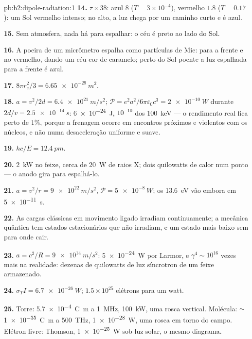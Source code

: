 \begin{solution}{pb:b2:dipole-radiation:1}
\textbf{14.} $\tau \times 38$: azul $8$ ($T = 3 \times 10^{-4}$), vermelho $1.8$ ($T = 0.17$): um Sol
vermelho intenso; no alto, a luz chega por um caminho curto e é azul.

\textbf{15.} Sem atmosfera, nada há para espalhar: o céu é preto ao lado
do Sol.

\textbf{16.} A poeira de um micrômetro espalha como partículas de Mie: para a frente e no
vermelho, dando um céu cor de caramelo; perto do Sol poente a luz
espalhada para a frente é azul.

\textbf{17.} $8\pi r_e^2/3 = \qty{6.65e-29}{m^2}$.

\textbf{18.} $a = v^2/2d = \qty{6.4e21}{m/s^2}$; $\mathcal P = e^2a^2/6\pi\varepsilon_0c^3 =
\qty{2e-10}{W}$ durante $2d/v = \qty{2.5e-14}{s}$: \qty{6e-24}{J}, $10^{-10}$ dos
\qty{100}{keV} --- o rendimento real fica perto de $1\%$, porque a frenagem ocorre
em encontros próximos e violentos com os núcleos, e não numa desaceleração
uniforme e suave.

\textbf{19.} $hc/E = \qty{12.4}{pm}$.

\textbf{20.} \qty{2}{kW} no feixe, cerca de \qty{20}{W} de raios X; dois quilowatts
de calor num ponto --- o anodo gira para espalhá-lo.

\textbf{21.} $a = v^2/r = \qty{9e22}{m/s^2}$, $\mathcal P = \qty{5e-8}{W}$; os \qty{13.6}{eV} vão embora
em \qty{5e-11}{s}.

\textbf{22.} As cargas clássicas em movimento ligado irradiam continuamente;
a mecânica quântica tem estados estacionários que não irradiam, e um estado mais baixo
sem para onde cair.

\textbf{23.} $a = c^2/R = \qty{9e14}{m/s^2}$: \qty{5e-24}{W} por Larmor, e $\gamma^4 \sim 10^{16}$
vezes mais na realidade: dezenas de quilowatts de luz síncrotron de um
feixe armazenado.

\textbf{24.} $\sigma_TI = \qty{6.7e-26}{W}$; $1.5 \times 10^{25}$ elétrons para um watt.

\textbf{25.} Torre: \qty{5.7e-4}{C.m} a \qty{1}{MHz}, \qty{100}{kW}, uma rosca
vertical. Molécula: $\sim$\qty{1e-35}{C.m} a \qty{500}{THz}, \qty{1e-28}{W},
uma rosca em torno do campo. Elétron livre: Thomson, \qty{1e-25}{W} sob
luz solar, o mesmo diagrama.
\end{solution}

